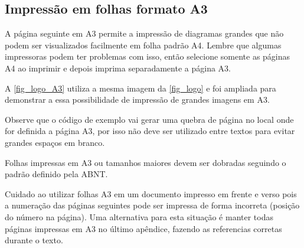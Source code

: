
\subsection{Impressão em folhas formato A3}

A página seguinte em A3 permite a impressão de diagramas grandes que não podem ser visualizados facilmente em folha padrão A4. Lembre que algumas impressoras podem ter problemas com isso, então selecione somente as páginas A4 ao imprimir e depois imprima separadamente a página A3.

A \autoref{fig_logo_A3} utiliza a mesma imagem da \autoref{fig_logo} e foi ampliada para demonstrar a essa possibilidade de impressão de grandes imagens em A3.

Observe que o código de exemplo vai gerar uma quebra de página no local onde for definida a página A3, por isso não deve ser utilizado entre textos para evitar grandes espaços em branco.

Folhas impressas em A3 ou tamanhos maiores devem ser dobradas seguindo o padrão definido pela ABNT. 


Cuidado ao utilizar folhas A3 em um documento impresso em frente e verso pois a numeração das páginas seguintes pode ser impressa de forma incorreta (posição do número na página). Uma alternativa para esta situação é manter todas páginas impressas em A3 no último apêndice, fazendo as referencias corretas durante o texto.




%
